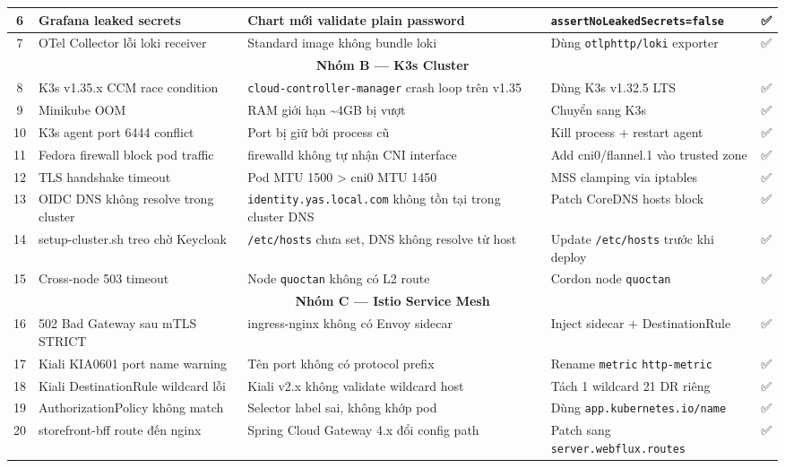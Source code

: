 \begin{center}
\begin{longtable}{|c|p{3cm}|p{3.8cm}|p{3.8cm}|c|}
\hline
6 & Grafana leaked secrets & Chart mới validate plain password & \texttt{assertNoLeakedSecrets=false} & ✅ \\
\hline
7 & OTel Collector lỗi loki receiver & Standard image không bundle loki & Dùng \texttt{otlphttp/loki} exporter & ✅ \\
\hline
\multicolumn{5}{|c|}{\textbf{Nhóm B — K3s Cluster}} \\
\hline
8 & K3s v1.35.x CCM race condition & \texttt{cloud-controller-manager} crash loop trên v1.35 & Dùng K3s v1.32.5 LTS & ✅ \\
\hline
9 & Minikube OOM & RAM giới hạn \textasciitilde{}4GB bị vượt & Chuyển sang K3s & ✅ \\
\hline
10 & K3s agent port 6444 conflict & Port bị giữ bởi process cũ & Kill process + restart agent & ✅ \\
\hline
11 & Fedora firewall block pod traffic & firewalld không tự nhận CNI interface & Add cni0/flannel.1 vào trusted zone & ✅ \\
\hline
12 & TLS handshake timeout & Pod MTU 1500 \textgreater{} cni0 MTU 1450 & MSS clamping via iptables & ✅ \\
\hline
13 & OIDC DNS không resolve trong cluster & \texttt{identity.yas.local.com} không tồn tại trong cluster DNS & Patch CoreDNS hosts block & ✅ \\
\hline
14 & setup-cluster.sh treo chờ Keycloak & \texttt{/etc/hosts} chưa set, DNS không resolve từ host & Update \texttt{/etc/hosts} trước khi deploy & ✅ \\
\hline
15 & Cross-node 503 timeout & Node \texttt{quoctan} không có L2 route & Cordon node \texttt{quoctan} & ✅ \\
\hline
\multicolumn{5}{|c|}{\textbf{Nhóm C — Istio Service Mesh}} \\
\hline
16 & 502 Bad Gateway sau mTLS STRICT & ingress-nginx không có Envoy sidecar & Inject sidecar + DestinationRule & ✅ \\
\hline
17 & Kiali KIA0601 port name warning & Tên port không có protocol prefix & Rename \texttt{metric} \textrightarrow{} \texttt{http-metric} & ✅ \\
\hline
18 & Kiali DestinationRule wildcard lỗi & Kiali v2.x không validate wildcard host & Tách 1 wildcard \textrightarrow{} 21 DR riêng & ✅ \\
\hline
19 & AuthorizationPolicy không match & Selector label sai, không khớp pod & Dùng \texttt{app.kubernetes.io/name} & ✅ \\
\hline
20 & storefront-bff route đến nginx & Spring Cloud Gateway 4.x đổi config path & Patch sang \texttt{server.webflux.routes} & ✅ \\

\end{longtable}
\end{center}

